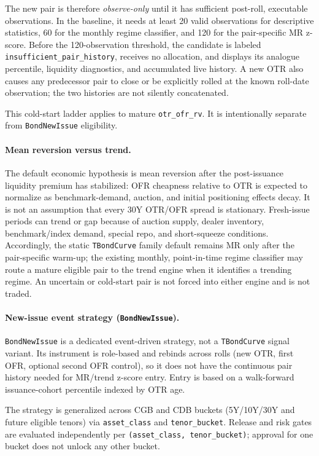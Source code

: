 The new pair is therefore \emph{observe-only} until it has sufficient post-roll,
executable observations.  In the baseline, it needs at least 20 valid observations
for descriptive statistics, 60 for the monthly regime classifier, and 120 for the
pair-specific MR z-score.  Before the 120-observation threshold, the candidate is
labeled \texttt{insufficient\_pair\_history}, receives no allocation, and displays its
analogue percentile, liquidity diagnostics, and accumulated live history.  A new OTR
also causes any predecessor pair to close or be explicitly rolled at the known
roll-date observation; the two histories are not silently concatenated.

This cold-start ladder applies to mature \texttt{otr\_ofr\_rv}. It is intentionally
separate from \texttt{BondNewIssue} eligibility.

\paragraph{Mean reversion versus trend.}
The default economic hypothesis is mean reversion after the post-issuance liquidity
premium has stabilized: OFR cheapness relative to OTR is expected to normalize as
benchmark-demand, auction, and initial positioning effects decay.  It is not an
assumption that every 30Y OTR/OFR spread is stationary.  Fresh-issue periods can
trend or gap because of auction supply, dealer inventory, benchmark/index demand,
special repo, and short-squeeze conditions.  Accordingly, the static \texttt{TBondCurve}
family default remains MR only after the pair-specific warm-up; the existing monthly,
point-in-time regime classifier may route a mature eligible pair to the trend engine
when it identifies a trending regime.  An uncertain or cold-start pair is not forced
into either engine and is not traded.

\paragraph{New-issue event strategy (\texttt{BondNewIssue}).}
\texttt{BondNewIssue} is a dedicated event-driven strategy, not a
\texttt{TBondCurve} signal variant. Its instrument is role-based and rebinds across
rolls (new OTR, first OFR, optional second OFR control), so it does not have the
continuous pair history needed for MR/trend z-score entry. Entry is based on a
walk-forward issuance-cohort percentile indexed by OTR age.

The strategy is generalized across CGB and CDB buckets (5Y/10Y/30Y and future
eligible tenors) via \texttt{asset\_class} and \texttt{tenor\_bucket}. Release and
risk gates are evaluated independently per \texttt{(asset\_class, tenor\_bucket)};
approval for one bucket does not unlock any other bucket.


